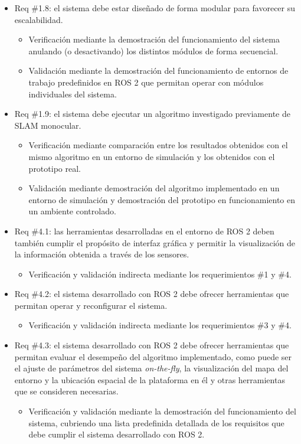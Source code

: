 \documentclass[
11pt, %
codirector, %
]{charter}
\begin{document}
\begin{itemize}
\begin{itemize}
	\end{itemize}
	\item Req \#1.8: el sistema debe estar diseñado de forma modular para favorecer su escalabilidad.
	\begin{itemize}
		\item Verificación mediante la demostración del funcionamiento del sistema anulando (o desactivando) los distintos módulos de forma secuencial.
		\item Validación mediante la demostración del funcionamiento de entornos de trabajo predefinidos en ROS 2 que permitan operar con módulos individuales del sistema.
	\end{itemize}
	\item Req \#1.9: el sistema debe ejecutar un algoritmo investigado previamente de SLAM monocular.
	\begin{itemize}
		\item Verificación mediante comparación entre los resultados obtenidos con el mismo algoritmo en un entorno de simulación y los obtenidos con el prototipo real.
		\item Validación mediante demostración del algoritmo implementado en un entorno de simulación y demostración del prototipo en funcionamiento en un ambiente controlado.
	\end{itemize}
	\item Req \#4.1: las herramientas desarrolladas en el entorno de ROS 2 deben también cumplir el propósito de interfaz gráfica y permitir la visualización de la información obtenida a través de los sensores.
	\begin{itemize}
		\item Verificación y validación indirecta mediante los requerimientos \#1 y \#4.
	\end{itemize}
	\item Req \#4.2: el sistema desarrollado con ROS 2 debe ofrecer herramientas que permitan operar y reconfigurar el sistema.
	\begin{itemize}
		\item Verificación y validación indirecta mediante los requerimientos \#3 y \#4.
	\end{itemize}
	\item Req \#4.3: el sistema desarrollado con ROS 2 debe ofrecer herramientas que permitan evaluar el desempeño del algoritmo implementado, como puede ser el ajuste de parámetros del sistema \textit{on-the-fly}, la visualización del mapa del entorno y la ubicación espacial de la plataforma en él y otras herramientas que se consideren necesarias.
	\begin{itemize}
		\item Verificación y validación mediante la demostración del funcionamiento del sistema, cubriendo una lista predefinida detallada de los requisitos que debe cumplir el sistema desarrollado con ROS 2.
	\end{itemize}
\end{itemize}
\end{document}
